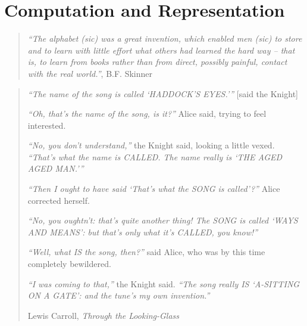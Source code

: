 \chapter{Computation and Representation}\label{chaprepres}


\begin{quote}
\emph{``The alphabet (sic) was a great invention, which enabled men
(sic) to store and to learn with little effort what others had learned
the hard way -- that is, to learn from books rather than from direct,
possibly painful, contact with the real world.''}, B.F. Skinner
\end{quote}

\begin{quote}
\emph{``The name of the song is called `HADDOCK'S EYES.'''} {[}said the
Knight{]}

\emph{``Oh, that's the name of the song, is it?''} Alice said, trying to
feel interested.

\emph{``No, you don't understand,''} the Knight said, looking a little
vexed. \emph{``That's what the name is CALLED. The name really is `THE
AGED AGED MAN.'''}

\emph{``Then I ought to have said `That's what the SONG is called'?''}
Alice corrected herself.

\emph{``No, you oughtn't: that's quite another thing! The SONG is called
`WAYS AND MEANS': but that's only what it's CALLED, you know!''}

\emph{``Well, what IS the song, then?''} said Alice, who was by this
time completely bewildered.

\emph{``I was coming to that,''} the Knight said. \emph{``The song
really IS `A-SITTING ON A GATE': and the tune's my own invention.''}

Lewis Carroll, \emph{Through the Looking-Glass}
\end{quote}

